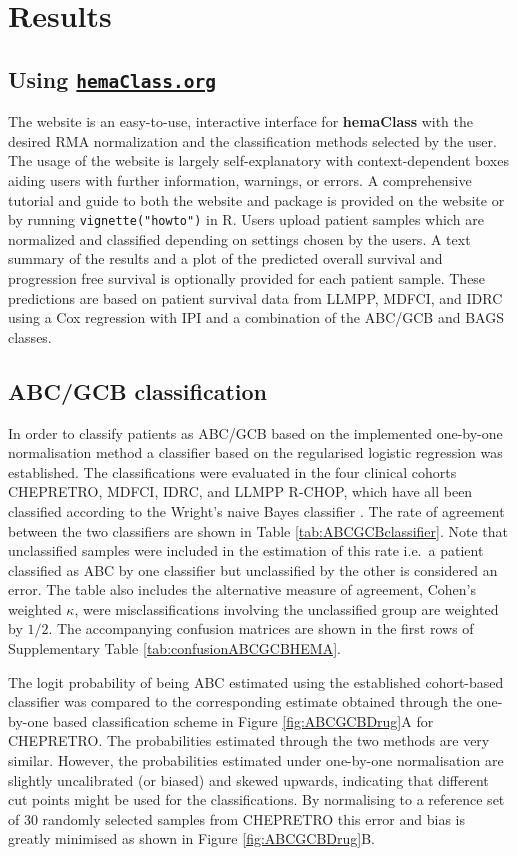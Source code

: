 \documentclass{bmcart}
\newcommand{\hemaClass}{\href{http://hemaClass.org}{\texttt{hemaClass.org}}}
\newcommand{\R}{\textsf{R}}
\newcommand{\pkg}[1]{\textbf{#1}}
\begin{document}
\section{Results}
\subsection{Using \hemaClass{}}
The website is an easy-to-use, interactive interface for \pkg{hemaClass} with the desired RMA normalization and the classification methods selected by the user.
The usage of the website is largely self-explanatory with context-dependent boxes aiding users with further information, warnings, or errors.
A comprehensive tutorial and guide to both the website and package is provided on the website or by running \texttt{vignette("howto")} in \R{}.
Users upload patient samples which are normalized and classified depending on settings chosen by the users.
A text summary of the results and a plot of the predicted overall survival and progression free survival is optionally provided for each patient sample.
These predictions are based on patient survival data from LLMPP, MDFCI, and IDRC using a Cox regression with IPI and a combination of the ABC/GCB and BAGS classes.



\subsection{ABC/GCB classification}
In order to classify patients as ABC/GCB based on the implemented one-by-one normalisation method a classifier based on the regularised logistic regression was established.
The classifications were evaluated in the four clinical cohorts CHEPRETRO, MDFCI, IDRC, and LLMPP R-CHOP, which have all been classified according to the Wright's naive Bayes classifier \citep{Wright2003,Lenz2008a}.
The rate of agreement between the two classifiers are shown in Table \ref{tab:ABCGCBclassifier}.
Note that unclassified samples were included in the estimation of this rate i.e.\ a patient classified as ABC by one classifier but unclassified by the other is considered an error.
The table also includes the alternative measure of agreement, Cohen's weighted $\kappa$, were misclassifications involving the unclassified group are weighted by $1/2$.
The accompanying confusion matrices are shown in the first rows of Supplementary Table \ref{tab:confusionABCGCBHEMA}.

The logit probability of being ABC estimated using the established cohort-based classifier was compared to the corresponding estimate obtained through the one-by-one based classification scheme in Figure \ref{fig:ABCGCBDrug}A for CHEPRETRO.
The probabilities estimated through the two methods are very similar.
However, the probabilities estimated under one-by-one normalisation are slightly uncalibrated (or biased) and skewed upwards, indicating that different cut points might be used for the classifications.
By normalising to a reference set of $30$ randomly selected samples from CHEPRETRO this error and bias is greatly minimised as shown in Figure \ref{fig:ABCGCBDrug}B.
\end{document}

